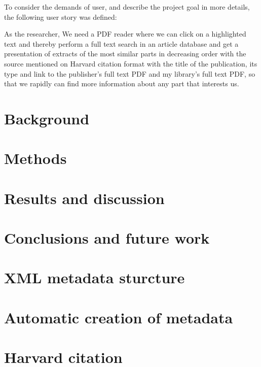 \documentclass[a4paper,twocolumn,twoside]{article}
\begin{document}
	To consider the demands of user, and describe the project goal in more details, the following user story was defined:
	
	As the researcher, We need a PDF reader where we can click on a highlighted text and thereby perform a full text search in an article database and get a presentation of extracts of the most similar parts in decreasing order with the source mentioned on Harvard citation format with the title of the publication, its type and link to the publisher’s full text PDF and my library’s full text PDF, so that we rapidly can find more information about any part that interests us.

	

	\section{Background}
	\label{Background}
	

	\section{Methods}
	\label{Methods}
	
	
	
	
	\section{Results and discussion}
	\label{Results and discussion}
	

	\section{Conclusions and future work}
	\label{Conclusions and future work}
    
    
    

	\appendix
	\section{XML metadata sturcture}
	\label{XML}
	
	
	\section{Automatic creation of metadata}
	\label{metadata_creation}
	
	
	\section{Harvard citation}
	\label{Harvard}
	

		
	
		
	\clearpage 
\end{document}
